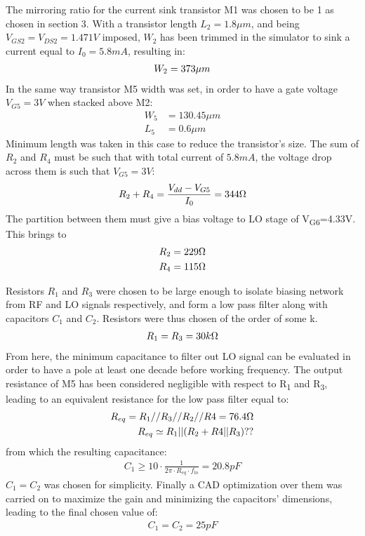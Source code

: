 The mirroring ratio for the current sink transistor M1 was chosen to be 1 as chosen in section 3. With a transistor length \(L_2 = 1.8\mu m\), and being \(V_{GS2}=V_{DS2}=1.471V\) imposed, \(W_2\) has been trimmed in the simulator to sink a current equal to \(I_0=5.8mA\), resulting in:
\begin{align}
W_2=373\mu m \notag
\end{align} 
In the same way transistor M5 width was set, in order to have a gate voltage \(V_{G5}=3V\) when stacked above M2:
\begin{align}
	W_5&=130.45\mu m \nonumber\\
	L_5&=0.6\mu m \nonumber
\end{align}
Minimum length was taken in this case to reduce the transistor's size.
The sum of \(R_2\) and \(R_4\) must be such that with total current of \(5.8mA\), the voltage drop across them is such that \(V_{G5}=3V\):
\begin{align}
	R_2+R_4=\frac{V_{dd}-V_{G5}}{I_0} = 344\ohm \nonumber
\end{align}
The partition between them must give a bias voltage to LO stage of V\textsubscript{G6}=4.33V. This brings to
\begin{align}
	R_2=229\ohm\nonumber\\
	R_4=115\ohm\nonumber
\end{align}

Resistors \(R_1\) and \(R_3\) were chosen to be large enough to isolate biasing network from RF and LO signals respectively, and form a low pass filter along with capacitors \(C_1\) and \(C_2\). Resistors were thus chosen of the order of some k\ohm.
\begin{align}
	R_1=R_3=30k\ohm \nonumber
\end{align}
From here, the minimum capacitance to filter out LO signal can be evaluated in order to have a pole at least one decade before working frequency. The output resistance of M5 has been considered negligible with respect to R\textsubscript{1} and R\textsubscript{3}, leading to an equivalent resistance for the low pass filter equal to:
\begin{align}
	R_{eq}=R_1//R_3//R_2//R4=76.4 \ohm \nonumber \\
	R_{eq} \simeq R_1||(R_2+R4||R_3)??
\end{align}
from which the resulting capacitance:
\begin{align}
	C_1\ge 10\cdot \frac{1}{2\pi \cdot R_{eq} \cdot f_{lo }} = 20.8pF
\end{align}
\(C_1 = C_2\) was chosen for simplicity. Finally a CAD optimization over them was carried on to maximize the gain and minimizing the capacitors' dimensions, leading to the final chosen value of:
\begin{align}
	C_1=C_2=25pF
\end{align}


